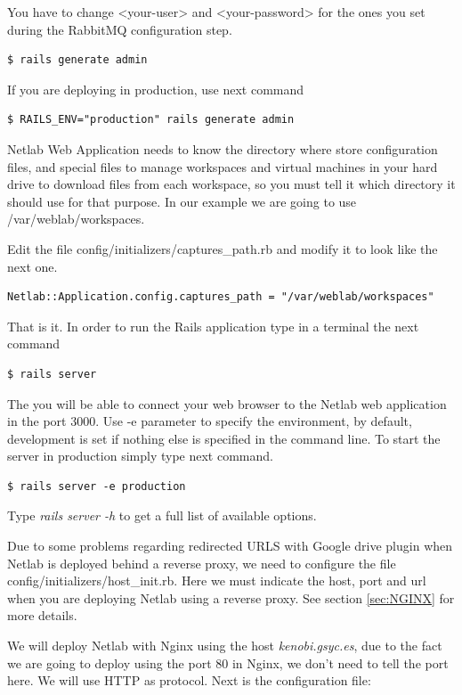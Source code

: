 \documentclass{article}
\begin{document}
You have to change <your-user> and <your-password> for the ones you set
during the RabbitMQ configuration step.

\begin{verbatim}
$ rails generate admin
\end{verbatim}

If you are deploying in production, use next command
\begin{verbatim}
$ RAILS_ENV="production" rails generate admin
\end{verbatim}

Netlab Web Application needs to know the directory where store configuration files, and special files to manage workspaces and virtual machines in your hard drive to download files from each workspace, so you must tell it which directory it should use for that purpose. In our example we are going to use /var/weblab/workspaces.

Edit the file config/initializers/captures\_path.rb and modify it to look like the next one.

\begin{verbatim}
Netlab::Application.config.captures_path = "/var/weblab/workspaces"
\end{verbatim}

That is it. In order to run the Rails application type in a terminal the next command
\begin{verbatim}
$ rails server
\end{verbatim}

The you will be able to connect your web browser to the Netlab web application in the port 3000. Use -e parameter to specify the environment, by default, development is set if nothing else is specified in the command line. To start the server in production simply type next command.


\begin{verbatim}
$ rails server -e production
\end{verbatim}

Type \textit{rails server -h} to get a full list of available options.

Due to some problems regarding redirected URLS with Google drive plugin when Netlab is deployed behind a reverse proxy, we need to configure the file config/initializers/host\_init.rb. Here we must indicate the host, port and url when you are deploying Netlab using a reverse proxy. See section \ref{sec:NGINX} for more details.

We will deploy Netlab with Nginx using the host \textit{kenobi.gsyc.es}, due to the fact we are going to deploy using the port 80 in Nginx, we don't need to tell the port here. We will use HTTP as protocol. Next is the configuration file:
\end{document}
